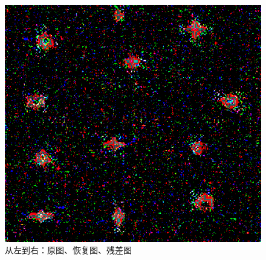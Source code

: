 \documentclass{article}
\begin{document}
\begin{figure}[h]
    	\quad
    	\includegraphics[scale=0.276]{../figures/E-4.png}
    	\caption{从左到右：原图、恢复图、残差图}
    \end{figure}
\end{document}
